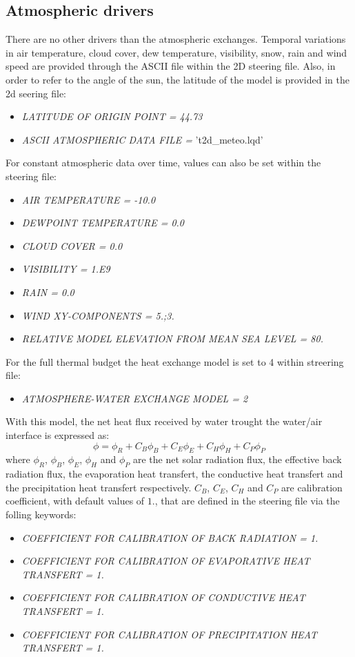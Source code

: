 \subsection{Atmospheric drivers}

There are no other drivers than the atmospheric exchanges. Temporal variations in air temperature, cloud cover, dew temperature, visibility, snow, rain and wind speed are provided through the ASCII file within the \telemac2D steering file. Also, in order to refer to the angle of the sun, the latitude of the model is provided in the \telemac2d seering file:
\begin{itemize}
    \item\textit{LATITUDE OF ORIGIN POINT = 44.73}
    \item\textit{ASCII ATMOSPHERIC DATA FILE =} 't2d\_meteo.lqd'
\end{itemize}
For constant atmospheric data over time, values can also be set within the \khione steering file:
\begin{itemize}
    \item\textit{AIR TEMPERATURE      = -10.0}
    \item\textit{DEWPOINT TEMPERATURE =   0.0}
    \item\textit{CLOUD COVER          =   0.0}
    \item\textit{VISIBILITY           =   1.E9}
    \item\textit{RAIN                 =   0.0}
    \item\textit{WIND XY-COMPONENTS   =   5.;3.}
    \item\textit{RELATIVE MODEL ELEVATION FROM MEAN SEA LEVEL = 80.}
\end{itemize}

For the full thermal budget the heat exchange model is set to 4 within \khione streering file:
\begin{itemize}
    \item\textit{ATMOSPHERE-WATER EXCHANGE MODEL = 2}
\end{itemize}
With this model, the net heat flux received by water trought the water/air interface is expressed as:
\begin{equation}
\phi = \phi_R + C_B\phi_B + C_E\phi_E + C_H\phi_H + C_P\phi_P
\end{equation}
where $\phi_R$, $\phi_B$, $\phi_E$, $\phi_H$ and $\phi_P$ are the net solar radiation flux, the effective back
radiation flux, the evaporation heat transfert, the conductive heat transfert and the precipitation heat
transfert respectively. $C_B$, $C_E$, $C_H$ and $C_P$ are calibration coefficient, with default values of $1.$,
that are defined in the \khione steering file via the folling keywords:
\begin{itemize}
    \item\textit{COEFFICIENT FOR CALIBRATION OF BACK RADIATION = 1.}
    \item\textit{COEFFICIENT FOR CALIBRATION OF EVAPORATIVE HEAT TRANSFERT = 1.}
    \item\textit{COEFFICIENT FOR CALIBRATION OF CONDUCTIVE HEAT TRANSFERT = 1.}
    \item\textit{COEFFICIENT FOR CALIBRATION OF PRECIPITATION HEAT TRANSFERT = 1.}
\end{itemize}

